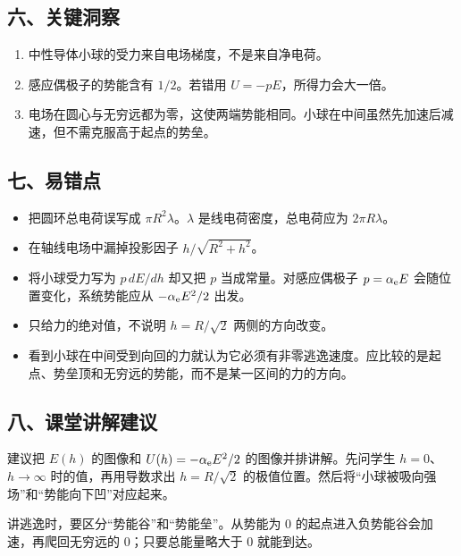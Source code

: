 \documentclass[12pt,a4paper,UTF8]{ctexart}
\newcommand{\tightlist}{\setlength{\itemsep}{0pt}\setlength{\parskip}{0pt}}
\begin{document}
\subsection{六、关键洞察}\label{ux516dux5173ux952eux6d1eux5bdf-2}

\begin{enumerate}
\def\labelenumi{\arabic{enumi}.}
\tightlist
\item
  中性导体小球的受力来自电场梯度，不是来自净电荷。
\item
  感应偶极子的势能含有 \(1/2\)。若错用 \(U=-pE\)，所得力会大一倍。
\item
  电场在圆心与无穷远都为零，这使两端势能相同。小球在中间虽然先加速后减速，但不需克服高于起点的势垒。
\end{enumerate}

\subsection{七、易错点}\label{ux4e03ux6613ux9519ux70b9-2}

\begin{itemize}
\tightlist
\item
  把圆环总电荷误写成 \(\pi R^2\lambda\)。\(\lambda\)
  是线电荷密度，总电荷应为 \(2\pi R\lambda\)。
\item
  在轴线电场中漏掉投影因子 \(h/\sqrt{R^2+h^2}\)。
\item
  将小球受力写为 \(p\,dE/dh\) 却又把 \(p\) 当成常量。对感应偶极子
  \(p=\alpha_{\rm e}E\) 会随位置变化，系统势能应从
  \(-\alpha_{\rm e}E^2/2\) 出发。
\item
  只给力的绝对值，不说明 \(h=R/\sqrt2\) 两侧的方向改变。
\item
  看到小球在中间受到向回的力就认为它必须有非零逃逸速度。应比较的是起点、势垒顶和无穷远的势能，而不是某一区间的力的方向。
\end{itemize}

\subsection{八、课堂讲解建议}\label{ux516bux8bfeux5802ux8bb2ux89e3ux5efaux8bae-2}

建议把 \(E(h)\) 的图像和 \(U(h)=-\alpha_{\rm e}E^2/2\)
的图像并排讲解。先问学生 \(h=0\)、\(h\to\infty\) 时的值，再用导数求出
\(h=R/\sqrt2\)
的极值位置。然后将``小球被吸向强场''和``势能向下凹''对应起来。

讲逃逸时，要区分``势能谷''和``势能垒''。从势能为 0
的起点进入负势能谷会加速，再爬回无穷远的 0；只要总能量略大于 0
就能到达。
\end{document}
